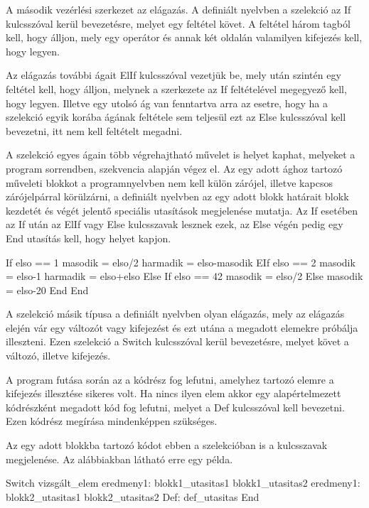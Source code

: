 A második vezérlési szerkezet az elágazás. A definiált nyelvben a szelekció az If kulcsszóval kerül bevezetésre, melyet egy feltétel követ. A feltétel három tagból kell, hogy álljon, mely egy operátor és annak két oldalán valamilyen kifejezés kell, hogy legyen.

Az elágazás további ágait ElIf kulcsszóval vezetjük be, mely után szintén egy feltétel kell, hogy álljon, melynek a szerkezete az If feltételével megegyező kell, hogy legyen. Illetve egy utolsó ág van fenntartva arra az esetre, hogy ha a szelekció egyik korába ágának feltétele sem teljesül ezt az Else kulcsszóval kell bevezetni, itt nem kell feltételt megadni.

A szelekció egyes ágain több végrehajtható művelet is helyet kaphat, melyeket a program sorrendben, szekvencia alapján végez el. Az egy adott ághoz tartozó műveleti blokkot a programnyelvben nem kell külön zárójel, illetve kapcsos zárójelpárral körülzárni, a definiált nyelvben az egy adott blokk határait blokk kezdetét és végét jelentő speciális utasítások megjelenése mutatja. Az If esetében az If után az ElIf vagy Else kulcsszavak lesznek ezek, az Else végén pedig egy End utasítás kell, hogy helyet kapjon.

\begin{cpp}
If elso == 1
	masodik = elso/2
	harmadik = elso-masodik
EIf elso == 2
	masodik = elso-1
	harmadik =  elso+elso
Else
	If elso == 42
		masodik = elso/2
	Else
		masodik = elso-20
	End
End
\end{cpp}

A szelekció másik típusa a definiált nyelvben olyan elágazás, mely az elágazás elején vár egy változót vagy kifejezést és ezt utána a megadott elemekre próbálja illeszteni. Ezen szelekció a Switch kulcsszóval kerül bevezetésre, melyet követ a változó, illetve kifejezés.

A program futása során az a kódrész fog lefutni, amelyhez tartozó elemre a kifejezés illesztése sikeres volt. Ha nincs ilyen elem akkor egy alapértelmezett kódrészként megadott kód fog lefutni, melyet a Def kulcsszóval kell bevezetni. Ezen kódrész megírása mindenképpen szükséges.

Az egy adott blokkba tartozó kódot ebben a szelekcióban is a kulcsszavak megjelenése. Az alábbiakban látható erre egy példa.

\begin{cpp}
Switch vizsgált_elem
	eredmeny1:
		blokk1_utasitas1
		blokk1_utasitas2
	eredmeny1:
		blokk2_utasitas1
		blokk2_utasitas2
	Def:
		def_utasitas
End
\end{cpp}

